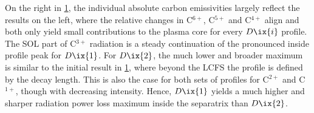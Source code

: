                 \begin{figure}[t]%
                    \centering%
                    \begin{minipage}[b]{0.48\textwidth}%
                        \centering%
                    \end{minipage}%
                    \hfill%
                    \begin{minipage}[b]{0.48\textwidth}%
                        \centering%
                    \end{minipage}%
                    \label{fig:rad_ratios_total_62_66}%
                \end{figure}%
%
                On the right in \cref{fig:rad_ratios_total_62_66}, the individual absolute carbon emissivities largely reflect the results on the left, where the relative changes in C$^{6+}$, C$^{5+}$ and C$^{4+}$ align and both only yield small contributions to the plasma core for every $D\ix{i}$ profile. The SOL part of C$^{3+}$ radiation is a steady continuation of the pronounced inside profile peak for $D\ix{1}$. For $D\ix{2}$, the much lower and broader maximum is similar to the initial result in \cref{fig:rad_ratios_total_62_66}, where beyond the LCFS the profile is defined by the decay length. This is also the case for both sets of profiles for C$^{2+}$ and C$^{1+}$, though with decreasing intensity. Hence, $D\ix{1}$ yields a much higher and sharper radiation power loss maximum inside the separatrix than $D\ix{2}$.\\%
%
